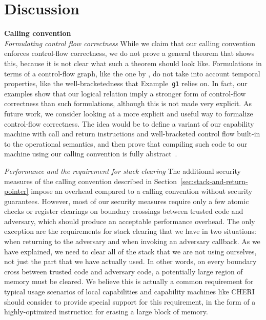 \documentclass[compsoc,conference,letterpaper,fleqn]{IEEEtran}
\begin{document}
\section{Discussion}
\label{sec:discussion}
\noindent\textbf{Calling convention}\\
\emph{Formulating control flow correctness} While we claim that our calling
convention enforces control-flow correctness, we do not prove a general theorem
that shows this, because it is not clear what such a theorem should look like.
Formulations in terms of a control-flow graph, like the one by
\citet{abadi_control-flow_2005}, do not take into account temporal properties,
like the well-bracketedness that Example~\texttt{\footnotesize{g1}} relies on.
In fact, our examples show that our logical relation imply a stronger form of
control-flow correctness than such formulations, although this is not made very
explicit. As future work, we consider looking at a more explicit and useful way
to formalize control-flow correctness. The idea would be to define a variant
of our capability machine with call and return instructions and
well-bracketed control flow built-in to the operational semantics, and then
prove that compiling such code to our machine using our calling convention is
fully abstract~\citep{abadi_protection_1998}.

\emph{Performance and the requirement for stack clearing} The additional
security measures of the calling convention described in
Section~\ref{sec:stack-and-return-pointer} impose an overhead compared to a
calling convention without security guarantees. However, most of our security measures
require only a few atomic checks or register clearings on boundary crossings
between trusted code and adversary, which should produce an acceptable
performance overhead. The only exception are the requirements for stack clearing
that we have in two situations: when returning to the adversary and when
invoking an adversary callback. As we have explained, we need to clear all of
the stack that we are not using ourselves, not just the part that we have
actually used. In other words, on every boundary cross between trusted code and
adversary code, a potentially large region of memory must be cleared. We believe
this is actually a common requirement for typical usage scenarios of local
capabilities and capability machines like CHERI should consider to provide
special support for this requirement, in the form of a highly-optimized
instruction for erasing a large block of memory.
\end{document}
